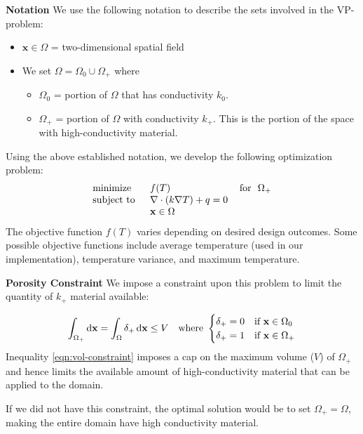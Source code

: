 \documentclass[final]{beamer}
\begin{document}
\begin{frame}[t]{\textbf{Notation}}
	We use the following notation to describe the sets involved in the VP-problem:
	\begin{itemize}
		\item $\mathbf{x}\in\Omega$ = two-dimensional spatial field
		\item[] We set $\Omega = \Omega_0\cup\Omega_+$ where
		\begin{itemize}
			\item $\Omega_0$ = portion of $\Omega$ that has {\color{baystate}conductivity $k_0$}.
			\item $\Omega_+$ = portion of $\Omega$ with {\color{baystate}conductivity $k_+$}. This is the portion of the space with high-conductivity material.
		\end{itemize}
	\end{itemize}\vfill\pause
	Using the above established notation, we develop the following optimization problem:
	\begin{equation}
		\begin{tabular}{lll}
			\text{minimize }   & $f(T)$                                                   & \text{for } $\Omega_+$ \\
			\text{subject to } & $\nabla\cdot\left(k\nabla T\right)+q=0$  &                                      \\
			& $\mathbf{x}\in\Omega$ &                                      
		\end{tabular}\label{SIMP-Optimization-Problem}
	\end{equation}\vfill\pause
	The objective function $f(T)$ varies depending on desired design outcomes. Some possible objective functions include average temperature (used in our implementation), temperature variance, and maximum temperature.
\end{frame}

\begin{frame}{\textbf{Porosity Constraint}}
	We impose a constraint upon this problem to limit the quantity of $k_+$ material available:
	
	\begin{equation}
		\int_{\Omega_+}\dif\mathbf{x}=\int_{\Omega}\delta_+\dif\mathbf{x}\leq V\quad\text{where }\begin{cases}\delta_+ = 0 & \text{if }\mathbf{x}\in\Omega_0 \\ \delta_+ = 1 & \text{if }\mathbf{x}\in\Omega_+\end{cases}\label{eqn:vol-constraint}
	\end{equation}\vfill\pause
	Inequality \eqref{eqn:vol-constraint} imposes a {\color{tiananmen}cap on the maximum volume ($V$) of $\Omega_+$} and hence limits the available amount of high-conductivity material that can be applied to the domain.\vfill
	
	If we did not have this constraint, the optimal solution would be to set $\Omega_+=\Omega$, making the entire domain have high conductivity material.\vfill
\end{frame}
\end{document}
